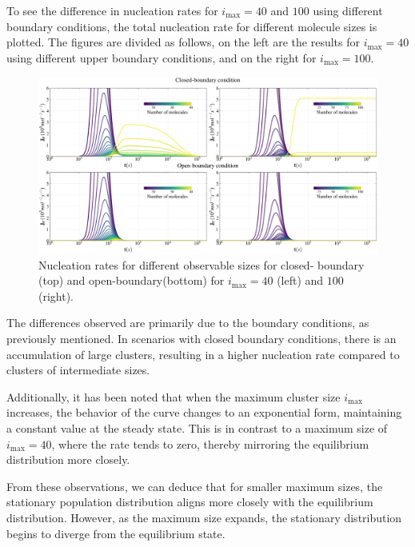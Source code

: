 To see the difference in nucleation rates for $i_{\text{max}} = 40$ and $100$ using different boundary conditions, 
the total nucleation rate for different molecule sizes is plotted.
The figures are divided as follows, on the left are the results for $i_{\text{max}} = 40$ using different upper boundary conditions, and on the right for $i_{\text{max}} = 100$.
\begin{figure}[H]
    \centering
    \hspace*{-2cm} %
    \includegraphics[width=1.2\linewidth]{laszlo_results/rate_evolution_comparison.png}
    \caption{Nucleation rates for different observable sizes for closed- boundary (top) and open-boundary(bottom) for $i_{\text{max}} = 40$ (left) and $100$ (right).}
    \label{fig:rate_evolution_comparison}
\end{figure}

The differences observed are primarily due to the boundary conditions, as previously mentioned. In scenarios with closed boundary conditions, there 
is an accumulation of large clusters, resulting in a higher nucleation rate compared to clusters of intermediate sizes.

Additionally, it has been noted that when the maximum cluster size $i_{\text{max}}$ increases, the behavior of the curve changes to an exponential form, maintaining a 
constant value at the steady state. This is in contrast to a maximum size of $i_{\text{max}} = 40$, where the rate tends to zero, thereby mirroring the equilibrium distribution more closely.

From these observations, we can deduce that for smaller maximum sizes, the stationary population distribution aligns more closely with the equilibrium distribution. 
However, as the maximum size expands, the stationary distribution begins to diverge from the equilibrium state.


